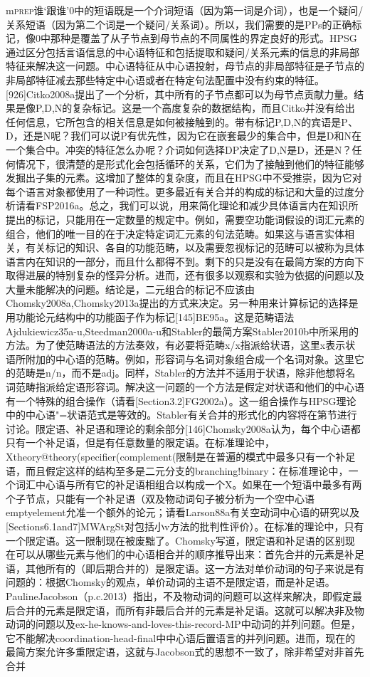 m\textsc{prep}谁`跟谁'0中的短语既是一个介词短语（因为第一词是介词），也是一个疑问/关系短语（因为第二个词是一个疑问/关系词）。所以，我们需要的是PPs的正确标记，像0中那种是覆盖了从子节点到母节点的不同属性的界定良好的形式。HPSG通过区分包括言语信息的中心语特征和包括提取和疑问/关系元素的信息的非局部特征来解决这一问题。中心语特征从中心语投射，母节点的非局部特征是子节点的非局部特征减去那些特定中心语或者在特定句法配置中没有约束的特征。[926]Citko2008a提出了一个分析，其中所有的子节点都可以为母节点贡献力量。结果是像P,D,N的复杂标记。这是一个高度复杂的数据结构，而且Citko并没有给出任何信息，它所包含的相关信息是如何被接触到的。带有标记P,D,N的宾语是P、D，还是N呢？我们可以说P有优先性，因为它在嵌套最少的集合中，但是D和N在一个集合中。冲突的特征怎么办呢？介词如何选择DP决定了D,N是D，还是N？任何情况下，很清楚的是形式化会包括循环的关系，它们为了接触到他们的特征能够发掘出子集的元素。这增加了整体的复杂度，而且在HPSG中不受推崇，因为它对每个语言对象都使用了一种词性。更多最近有关合并的构成的标记和大量的过度分析请看FSP2016a。总之，我们可以说，用来简化理论和减少具体语言内在知识所提出的标记，只能用在一定数量的规定中。例如，需要空功能词假设的词汇元素的组合，他们的唯一目的在于决定特定词汇元素的句法范畴。如果这与语言实体相关，有关标记的知识、各自的功能范畴，以及需要忽视标记的范畴可以被称为具体语言内在知识的一部分，而且什么都得不到。剩下的只是没有在最简方案的方向下取得进展的特别复杂的怪异分析。进而，还有很多以观察和实验为依据的问题以及大量未能解决的问题。结论是，二元组合的标记不应该由Chomsky2008a,Chomsky2013a提出的方式来决定。另一种用来计算标记的选择是用功能论元结构中的功能函子作为标记[145]BE95a。这是范畴语法Ajdukiewicz35a-u,Steedman2000a-u和Stabler的最简方案Stabler2010b中所采用的方法。为了使范畴语法的方法奏效，有必要将范畴x/x指派给状语，这里x表示状语所附加的中心语的范畴。例如，形容词与名词对象组合成一个名词对象。这里它的范畴是n/n，而不是adj。同样，Stabler的方法并不适用于状语，除非他想将名词范畴指派给定语形容词。解决这一问题的一个方法是假定对状语和他们的中心语有一个特殊的组合操作（请看[Section3.2]FG2002a）。这一组合操作与HPSG理论中的中心语"=状语范式是等效的。Stabler有关合并的形式化的内容将在第节进行讨论。限定语、补足语和理论的剩余部分[146]Chomsky2008a认为，每个中心语都只有一个补足语，但是有任意数量的限定语。在标准理论中，Xtheory@theory(specifier(complement(限制是在普遍的模式中最多只有一个补足语，而且假定这样的结构至多是二元分支的branching!binary：在标准理论中，一个词汇中心语与所有它的补足语相组合以构成一个X。如果在一个短语中最多有两个子节点，只能有一个补足语（双及物动词句子被分析为一个空中心语emptyelement允准一个额外的论元；请看Larson88a有关空动词中心语的研究以及[Sections6.1and7]MWArgSt对包括小v方法的批判性评价）。在标准的理论中，只有一个限定语。这一限制现在被废黜了。Chomsky写道，限定语和补足语的区别现在可以从哪些元素与他们的中心语相合并的顺序推导出来：首先合并的元素是补足语，其他所有的（即后期合并的）是限定语。这一方法对单价动词的句子来说是有问题的：根据Chomsky的观点，单价动词的主语不是限定语，而是补足语。PaulineJacobson（p.c.2013）指出，不及物动词的问题可以这样来解决，即假定最后合并的元素是限定语，而所有非最后合并的元素是补足语。这就可以解决非及物动词的问题以及ex-he-knows-and-loves-this-record-MP中动词的并列问题。但是，它不能解决coordination-head-final中中心语后置语言的并列问题。进而，现在的最简方案允许多重限定语，这就与Jacobson式的思想不一致了，除非希望对非首先合并